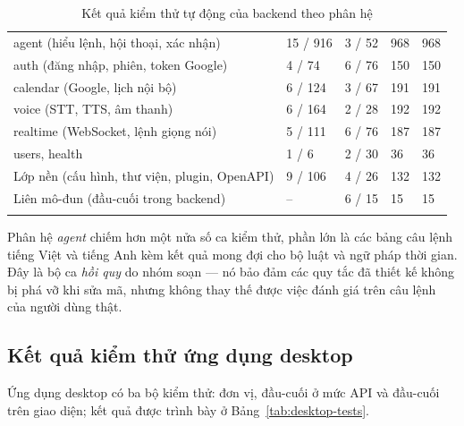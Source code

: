 \begin{table}[!htbp]
\caption{Kết quả kiểm thử tự động của backend theo phân hệ}\label{tab:backend-tests}
\bang
\begin{tabularx}{\textwidth}{|Y|C{2.2cm}|C{2.2cm}|C{1.7cm}|C{1.6cm}|}\hline
{} &  &  &  & \\\hline
agent (hiểu lệnh, hội thoại, xác nhận) & 15 / 916 & 3 / 52 & 968 & 968\\\hline
auth (đăng nhập, phiên, token Google) & 4 / 74 & 6 / 76 & 150 & 150\\\hline
calendar (Google, lịch nội bộ) & 6 / 124 & 3 / 67 & 191 & 191\\\hline
voice (STT, TTS, âm thanh) & 6 / 164 & 2 / 28 & 192 & 192\\\hline
realtime (WebSocket, lệnh giọng nói) & 5 / 111 & 6 / 76 & 187 & 187\\\hline
users, health & 1 / 6 & 2 / 30 & 36 & 36\\\hline
Lớp nền (cấu hình, thư viện, plugin, OpenAPI) & 9 / 106 & 4 / 26 & 132 & 132\\\hline
Liên mô-đun (đầu-cuối trong backend) & – & 6 / 15 & 15 & 15\\\hline
{} &  &  &  & \\\hline
\end{tabularx}
\end{table}
Phân hệ \textit{agent} chiếm hơn một nửa số ca kiểm thử, phần lớn là các bảng câu lệnh tiếng Việt và tiếng Anh kèm kết quả mong đợi cho bộ luật và ngữ pháp thời gian. Đây là bộ ca \textit{hồi quy} do nhóm soạn — nó bảo đảm các quy tắc đã thiết kế không bị phá vỡ khi sửa mã, nhưng không thay thế được việc đánh giá trên câu lệnh của người dùng thật.

\subsection{Kết quả kiểm thử ứng dụng desktop}
Ứng dụng desktop có ba bộ kiểm thử: đơn vị, đầu-cuối ở mức API và đầu-cuối trên giao diện; kết quả được trình bày ở Bảng~\ref{tab:desktop-tests}.

